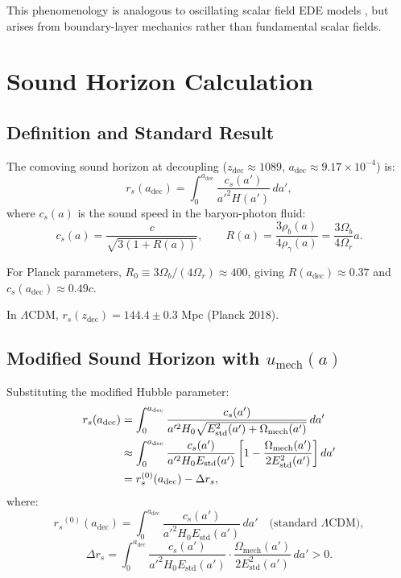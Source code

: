 \documentclass[11pt,a4paper]{article}
\newcommand{\cs}{\ensuremath{c_s}}
\newcommand{\umech}{\ensuremath{u_{\mathrm{mech}}}}
\newcommand{\adec}{\ensuremath{a_{\mathrm{dec}}}}
\newcommand{\zdec}{\ensuremath{z_{\mathrm{dec}}}}
\newcommand{\rs}{\ensuremath{r_s}}
\newcommand{\Omr}{\ensuremath{\Omega_r}}
\newcommand{\Omb}{\ensuremath{\Omega_b}}
\theoremstyle{definition}
\theoremstyle{remark}
\begin{document}
This phenomenology is analogous to oscillating scalar field EDE models \cite{Poulin2019,Smith2020}, but arises from boundary-layer mechanics rather than fundamental scalar fields.

\section{Sound Horizon Calculation}
\label{sec:sound_horizon}

\subsection{Definition and Standard Result}
\label{sec:rs_definition}

The comoving sound horizon at decoupling ($\zdec \approx 1089$, $\adec \approx 9.17 \times 10^{-4}$) is:
\begin{equation}
\label{eq:rs_definition}
\rs(\adec) = \int_0^{\adec} \frac{\cs(a')}{a'^2 H(a')} \, da',
\end{equation}
where $\cs(a)$ is the sound speed in the baryon-photon fluid:
\begin{equation}
\label{eq:cs_baryonphoton}
\cs(a) = \frac{c}{\sqrt{3(1 + R(a))}}, \qquad R(a) = \frac{3\rho_b(a)}{4\rho_\gamma(a)} = \frac{3\Omb}{4\Omr} a.
\end{equation}

For Planck parameters, $R_0 \equiv 3\Omb/(4\Omr) \approx 400$, giving $R(\adec) \approx 0.37$ and $\cs(\adec) \approx 0.49c$.

In $\Lambda$CDM, $\rs(\zdec) = 144.4 \pm 0.3$ Mpc (Planck 2018).

\subsection{Modified Sound Horizon with $\umech(a)$}
\label{sec:rs_modified}

Substituting the modified Hubble parameter:
\begin{align}
\rs(\adec) &= \int_0^{\adec} \frac{\cs(a')}{a'^2 H_0 \sqrt{E_{\mathrm{std}}^2(a') + \Omega_{\mathrm{mech}}(a')}} \, da' \notag \\
&\approx \int_0^{\adec} \frac{\cs(a')}{a'^2 H_0 E_{\mathrm{std}}(a')} \left[ 1 - \frac{\Omega_{\mathrm{mech}}(a')}{2E_{\mathrm{std}}^2(a')} \right] da' \notag \\
&= \rs^{(0)}(\adec) - \Delta\rs,
\end{align}
where:
\begin{equation}
\label{eq:rs0}
\rs^{(0)}(\adec) = \int_0^{\adec} \frac{\cs(a')}{a'^2 H_0 E_{\mathrm{std}}(a')} \, da' \quad \text{(standard $\Lambda$CDM)},
\end{equation}
\begin{equation}
\label{eq:Delta_rs}
\boxed{\Delta\rs = \int_0^{\adec} \frac{\cs(a')}{a'^2 H_0 E_{\mathrm{std}}(a')} \cdot \frac{\Omega_{\mathrm{mech}}(a')}{2E_{\mathrm{std}}^2(a')} \, da' > 0.}
\end{equation}
\end{document}
